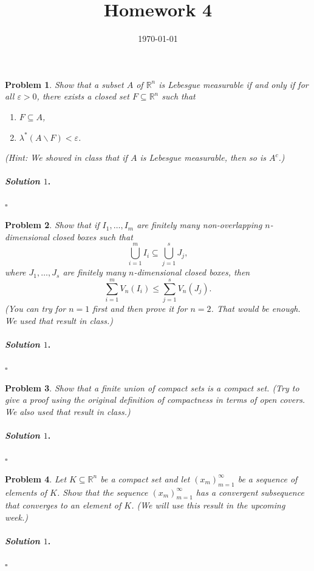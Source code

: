 \documentclass[reqno]{amsart}
\theoremstyle{plain}
\newtheorem{problem}{Problem}
\theoremstyle{definition}
\newenvironment{solution1}{\paragraph{\emph{Solution $1$}.}}{\hfill$\square$}
\begin{document}
 

\title[Homework 4]{Homework 4}

\date{\today} 
\maketitle 



\begin{problem}
Show that a subset $A$ of $\mathbb{R}^{n}$ is Lebesgue measurable if and only if for all $\varepsilon > 0$, there exists a closed set $F \subseteq \mathbb{R}^{n}$ such that
\begin{enumerate}
\item $F \subseteq A$,
\item $\lambda^{*}(A \smallsetminus F) < \varepsilon$.
\end{enumerate}
(Hint:  We showed in class that if $A$ is Lebesgue measurable, then so is $A^{c}$.)
\end{problem}
\begin{solution1}

\end{solution1}



\begin{problem}
Show that if $I_{1},\ldots,I_{m}$ are finitely many non-overlapping $n$-dimensional closed boxes such that
$$\bigcup_{i=1}^{m} I_{i} \subseteq \bigcup_{j=1}^{s}J_{j}, $$
where $J_{1},\ldots,J_{s}$ are finitely many $n$-dimensional closed boxes, then 
$$\sum_{i=1}^{m}V_{n}(I_{i}) \le \sum_{j=1}^{s}V_{n}(J_{j}). $$
(You can try for $n=1$ first and then prove it for $n=2$.  That would be enough.  We used that result in class.)
\end{problem}
\begin{solution1}

\end{solution1}


\begin{problem}
Show that a finite union of compact sets is a compact set.  (Try to give a proof using the original definition of compactness in terms of open covers.  We also used that result in class.)
\end{problem}
\begin{solution1}

\end{solution1}



\begin{problem}
Let $K \subseteq \mathbb{R}^{n}$ be a compact set and let $(x_{m})_{m=1}^{\infty}$ be a sequence of elements of $K$.  Show that the sequence $(x_{m})_{m=1}^{\infty}$ has a convergent subsequence that converges to an element of $K$.  (We will use this result in the upcoming week.)
\end{problem}
\begin{solution1}

\end{solution1}
\end{document}
